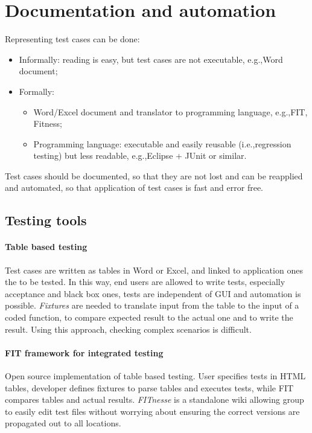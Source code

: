 \section{Documentation and automation}
Representing test cases can be done:
\begin{itemize}
\item Informally: reading is easy, but test cases are not executable, e.g.,\@ Word document;
\item Formally:
\begin{itemize}
\item Word/Excel document and translator to programming language, e.g.,\@ FIT, Fitness;
\item Programming language: executable and easily reusable (i.e.,\@ regression testing) but less readable, e.g.,\@ Eclipse + JUnit or similar.
\end{itemize}
\end{itemize}
Test cases should be documented, so that they are not lost and can be reapplied and automated, so that application of test cases is fast and error free.

\subsection{Testing tools}
\paragraph{Table based testing}
Test cases are written as tables in Word or Excel, and linked to application ones the to be tested. In this way, end users are allowed to write tests, especially acceptance and black box ones, tests are independent of GUI and automation is possible. \emph{Fixtures} are needed to translate input from the table to the input of a coded function, to compare expected result to the actual one and to write the result. Using this approach, checking complex scenarios is difficult.

\paragraph{FIT framework for integrated testing}
Open source implementation of table based testing. User specifies tests in HTML tables, developer defines fixtures to parse tables and executes tests, while FIT compares tables and actual results. \emph{FITnesse} is a standalone wiki allowing group to easily edit test files without worrying about ensuring the correct versions are propagated out to all locations.

